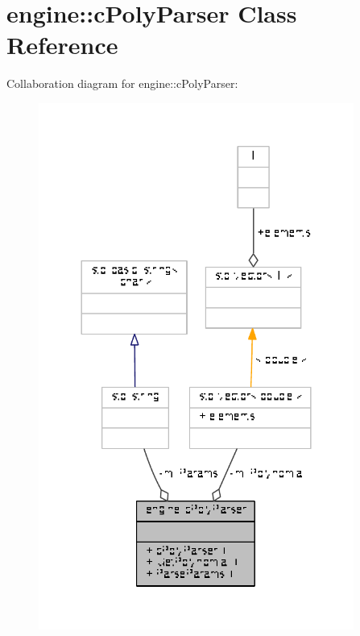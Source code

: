 \hypertarget{classengine_1_1cPolyParser}{\section{engine\-:\-:c\-Poly\-Parser Class Reference}
\label{classengine_1_1cPolyParser}
}


Collaboration diagram for engine\-:\-:c\-Poly\-Parser\-:
\nopagebreak
\begin{figure}[H]
\begin{center}
\leavevmode
\includegraphics[width=293pt]{classengine_1_1cPolyParser__coll__graph}
\end{center}
\end{figure}
